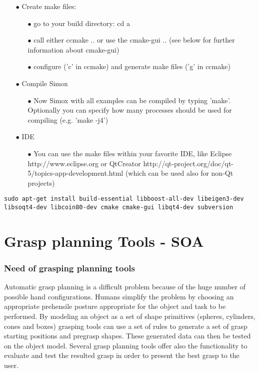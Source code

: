 \begin{itemize}
\begin{itemize}
\item[$\bullet$] Create make files: 
\begin{itemize}
\item[$\bullet$] go to your build directory: cd a
\item[$\bullet$] call either ccmake .. or use the cmake-gui .. (see below for further information about cmake-gui) 
\item[$\bullet$] configure ('c' in ccmake) and generate make files ('g' in ccmake) 
\end{itemize}
\item[$\bullet$] Compile Simox 
\begin{itemize}
\item[$\bullet$] Now Simox with all examples can be compiled by typing 'make'. Optionally you can specify how many processes should be used for compiling (e.g. 'make -j4') 
\end{itemize}
\item[$\bullet$] IDE 
\begin{itemize}
\item[$\bullet$] You can use the make files within your favorite IDE, like Eclipse http://www.eclipse.org or QtCreator http://qt-project.org/doc/qt-5/topics-app-development.html (which can be used also for non-Qt projects) 
\end{itemize}
\end{itemize}
\end{itemize}
\begin{lstlisting}
sudo apt-get install build-essential libboost-all-dev libeigen3-dev libsoqt4-dev libcoin80-dev cmake cmake-gui libqt4-dev subversion
\end{lstlisting}
\section{Grasp planning Tools - SOA}
\subsubsection{Need of grasping planning tools}
\par
Automatic grasp planning is a difficult problem because of the huge number of possible hand configurations. Humans simplify the problem by choosing an appropriate prehensile posture appropriate for the object and task to be performed. By modeling an object as a set of shape primitives (spheres, cylinders, cones and boxes) grasping tools can use a set of rules to generate a set of grasp starting positions and pregrasp shapes. These generated data can then be tested on the object model. Several grasp planning tools offer also the functionality to evaluate and test the resulted grasp in order to present the best grasp to the user.
